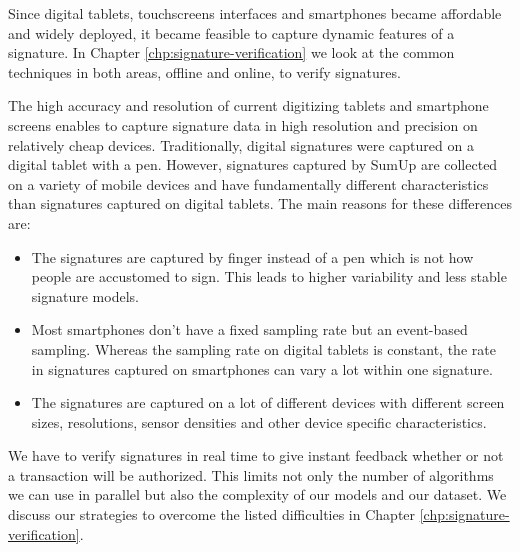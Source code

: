 \documentclass[a4paper, oneside]{csthesis}
\begin{document}
Since digital tablets, touchscreens interfaces and smartphones became affordable and widely deployed, it became feasible to capture dynamic features of a signature. In Chapter \ref{chp:signature-verification} we look at the common techniques in both areas, offline and online, to verify signatures.

The high accuracy and resolution of current digitizing tablets and smartphone screens enables to capture signature data in high resolution and precision on relatively cheap devices.
Traditionally, digital signatures were captured on a digital tablet with a pen. However, signatures captured by SumUp are collected on a variety of mobile devices and have fundamentally different characteristics than signatures captured on digital tablets. The main reasons for these differences are:

\begin{itemize}
    \item The signatures are captured by finger instead of a pen which is not how people are accustomed to sign. This leads to higher variability and less stable signature models.
    \item Most smartphones don't have a fixed sampling rate but an event-based sampling. Whereas the sampling rate on digital tablets is constant, the rate in signatures captured on smartphones can vary a lot within one signature.
    \item The signatures are captured on a lot of different devices with different screen sizes, resolutions, sensor densities and other device specific characteristics.
\end{itemize}

We have to verify signatures in real time to give instant feedback whether or not a transaction will be authorized. This limits not only the number of algorithms we can use in parallel but also the complexity of our models and our dataset.
We discuss our strategies to overcome the listed difficulties in Chapter \ref{chp:signature-verification}.




\end{document}
